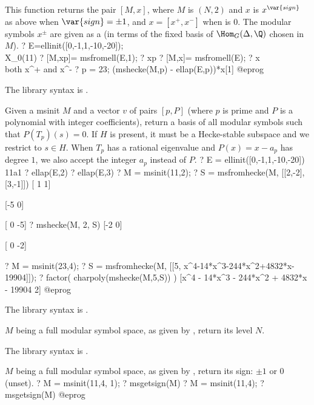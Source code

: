 This function returns the pair $[M, x]$, where $M$ is
$(N,2)$ and $x$ is $x^{\var{sign}}$ as above when $\var{sign}=
\pm1$, and $x = [x^+,x^-]$ when  is $0$.
The modular symbols $x^\pm$ are given as a  (in terms
of the fixed basis of $\Hom_G(\Delta,\Q)$ chosen in $M$).
\bprog
? E=ellinit([0,-1,1,-10,-20]);  \\ X_0(11)
? [M,xp]= msfromell(E,1);
? xp
? [M,x]= msfromell(E);
? x    \\ both x^+ and x^-
? p = 23; (mshecke(M,p) - ellap(E,p))*x[1]
@eprog

The library syntax is .

\label{se:msfromhecke}
Given a msinit $M$ and a vector $v$ of pairs $[p, P]$ (where $p$ is prime
and $P$ is a polynomial with integer coefficients), return a basis of all
modular symbols such that $P(T_p)(s) = 0$. If $H$ is present, it must
be a Hecke-stable subspace and we restrict to $s \in H$. When $T_p$ has
a rational eigenvalue and $P(x) = x-a_p$ has degree $1$, we also accept the
integer $a_p$ instead of $P$.
\bprog
? E = ellinit([0,-1,1,-10,-20]) \\11a1
? ellap(E,2)
? ellap(E,3)
? M = msinit(11,2);
? S = msfromhecke(M, [[2,-2],[3,-1]])
[ 1  1]

[-5  0]

[ 0 -5]
? mshecke(M, 2, S)
[-2  0]

[ 0 -2]

? M = msinit(23,4);
? S = msfromhecke(M, [[5, x^4-14*x^3-244*x^2+4832*x-19904]]);
? factor( charpoly(mshecke(M,5,S)) )
[x^4 - 14*x^3 - 244*x^2 + 4832*x - 19904 2]
@eprog

The library syntax is .

\label{se:msgetlevel}
$M$ being a full modular symbol space, as given by , return
its level $N$.

The library syntax is .

\label{se:msgetsign}
$M$ being a full modular symbol space, as given by , return
its sign: $\pm1$ or 0 (unset).
\bprog
? M = msinit(11,4, 1);
? msgetsign(M)
? M = msinit(11,4);
? msgetsign(M)
@eprog

